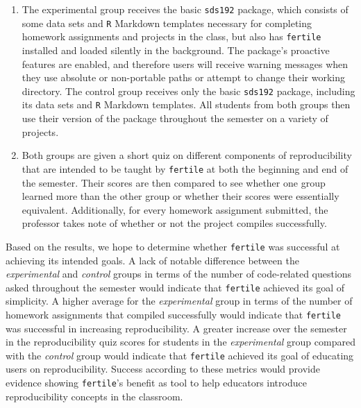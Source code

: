 \documentclass[12pt,twoside]{reedthesis}
\newenvironment{Shaded}{\begin{snugshade}}{\end{snugshade}}
\newcommand{\DataTypeTok}[1]{\textcolor[rgb]{0.13,0.29,0.53}{#1}}
\newcommand{\KeywordTok}[1]{\textcolor[rgb]{0.13,0.29,0.53}{\textbf{#1}}}
\newcommand{\NormalTok}[1]{#1}
\newcommand{\OperatorTok}[1]{\textcolor[rgb]{0.81,0.36,0.00}{\textbf{#1}}}
\newcommand{\StringTok}[1]{\textcolor[rgb]{0.31,0.60,0.02}{#1}}
\begin{document}
\begin{Shaded}
\end{Shaded}
\begin{enumerate}
\def\labelenumi{\arabic{enumi}.}
\setcounter{enumi}{3}
\item
  The experimental group receives the basic \texttt{sds192} package, which consists of some data sets and \texttt{R} Markdown templates necessary for completing homework assignments and projects in the class, but also has \texttt{fertile} installed and loaded silently in the background. The package's proactive features are enabled, and therefore users will receive warning messages when they use absolute or non-portable paths or attempt to change their working directory. The control group receives only the basic \texttt{sds192} package, including its data sets and \texttt{R} Markdown templates. All students from both groups then use their version of the package throughout the semester on a variety of projects.
\item
  Both groups are given a short quiz on different components of reproducibility that are intended to be taught by \texttt{fertile} at both the beginning and end of the semester. Their scores are then compared to see whether one group learned more than the other group or whether their scores were essentially equivalent. Additionally, for every homework assignment submitted, the professor takes note of whether or not the project compiles successfully.
\end{enumerate}
Based on the results, we hope to determine whether \texttt{fertile} was successful at achieving its intended goals. A lack of notable difference between the \emph{experimental} and \emph{control} groups in terms of the number of code-related questions asked throughout the semester would indicate that \texttt{fertile} achieved its goal of simplicity. A higher average for the \emph{experimental} group in terms of the number of homework assignments that compiled successfully would indicate that \texttt{fertile} was successful in increasing reproducibility. A greater increase over the semester in the reproducibility quiz scores for students in the \emph{experimental} group compared with the \emph{control} group would indicate that \texttt{fertile} achieved its goal of educating users on reproducibility. Success according to these metrics would provide evidence showing \texttt{fertile}'s benefit as tool to help educators introduce reproducibility concepts in the classroom.
\end{document}
